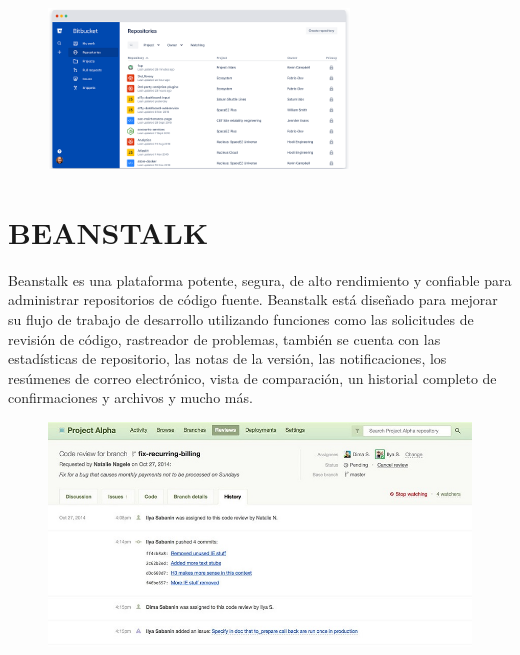 \documentclass[12pt,letterpaper]{article}
\begin{document}
\vspace*{-0.025in}
\begin{figure}[htb]
\begin{center}
\includegraphics[width=8cm]{./Imagenes/bitbucket}
\end{center}
\end{figure}

\section{BEANSTALK}
Beanstalk es una plataforma potente, segura, de alto rendimiento y confiable para administrar repositorios de código fuente.
Beanstalk está diseñado para mejorar su flujo de trabajo de desarrollo utilizando funciones como las solicitudes de revisión de código, rastreador de problemas, también se cuenta con las estadísticas de repositorio, las notas de la versión, las notificaciones, los resúmenes de correo electrónico, vista de comparación, un historial completo de confirmaciones y archivos y mucho más.

\vspace*{-0.025in}
\begin{figure}[htb]
\begin{center}
\includegraphics[width=16cm]{./Imagenes/beanssaltk}
\end{center}
\end{figure}
\end{document}
